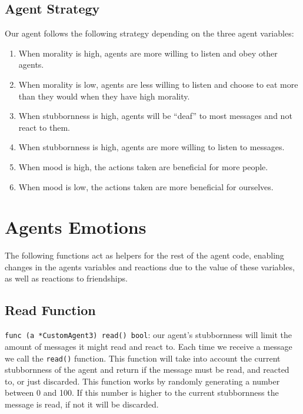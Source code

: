 \subsection{Agent Strategy}
Our agent follows the following strategy depending on the three agent variables:
\begin{enumerate}
    \item When morality is high, agents are more willing to listen and obey other agents.
    \item When morality is low, agents are less willing to listen and choose to eat more than they would when they have high morality.
    \item When stubbornness is high, agents will be “deaf” to most messages and not react to them.
    \item When stubbornness is high, agents are more willing to listen to messages.
    \item When mood is high, the actions taken are beneficial for more people.
    \item When mood is low, the actions taken are more beneficial for ourselves.
\end{enumerate}

\section{Agents Emotions}\label{agents_emotions}
The following functions act as helpers for the rest of the agent code, enabling changes in the agents variables and reactions due to the value of these variables, as well as reactions to friendships. 

\subsection{Read Function}
\texttt{func (a *CustomAgent3) read() bool}: our agent's stubbornness will limit the amount of messages it might read and react to. Each time we receive a message we call the \texttt{read()} function. This function will take into account the current stubbornness of the agent and return if the message must be read, and reacted to, or just discarded. 
This function works by randomly generating a number between 0 and 100. If this number is higher to the current stubbornness the message is read, if not it will be discarded. 

